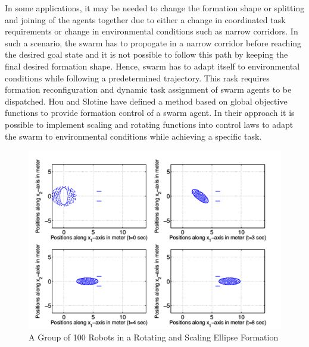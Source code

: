 In some applications, it may be needed to change the formation shape or splitting and joining of the agents together due to either a change in coordinated task requirements or change in environmental conditions such as narrow corridors. In such a scenario, the swarm has to propogate in a narrow corridor before reaching the desired goal state and it is not possible to follow this path by keeping the final desired formation shape. Hence, swarm has to adapt itself to environmental conditions while following a predetermined trajectory. This rask requires formation reconfiguration and dynamic task assignment of swarm agents to be dispatched. Hou and Slotine \cite{8} have defined a method based on global objective functions to provide formation control of a swarm agent. In their approach it is possible to implement scaling and rotating functions into control laws to adapt the swarm to environmental conditions while achieving a specific task. 

\begin{figure}[H]
	\caption{A Group of 100 Robots in a Rotating and Scaling Ellipse Formation \cite{8}} \label{slotine_fig_ref}
	\centering
	\includegraphics[scale = 1]{slotine}
\end{figure} 

